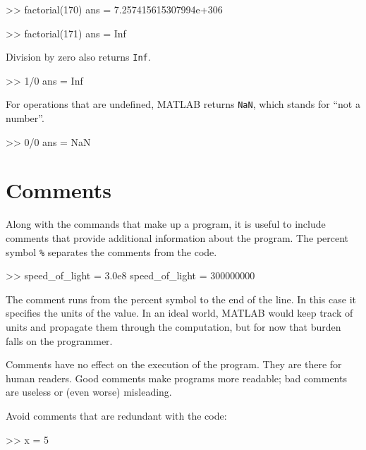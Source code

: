 \documentclass[main.tex]{subfiles}
\begin{document}

\begin{code}
>> factorial(170)
ans = 7.257415615307994e+306

>> factorial(171)
ans = Inf
\end{code}

Division by zero also returns {\tt Inf}.

\begin{code}
>> 1/0
ans = Inf
\end{code}


For operations that are undefined, MATLAB returns {\tt NaN},
which stands for ``not a number''.


\begin{code}
>> 0/0
ans = NaN
\end{code}



\section{Comments}

Along with the commands that make up a program, it is useful to include comments that provide additional information about the
program.  The percent symbol {\tt \%} separates
the comments from the code.


\begin{code}
>> speed_of_light = 3.0e8     %
speed_of_light = 300000000
\end{code}

The comment runs from the percent symbol to the end of the line.
In this case it specifies the units of the value.  In an ideal world,
MATLAB would keep track of units and propagate them through the
computation, but for now that burden falls on the programmer.


Comments have no effect on the execution of the program.  They
are there for human readers.  Good comments make programs more
readable; bad comments are useless or (even worse) misleading.

Avoid comments that are redundant with the code:

\begin{code}
>> x = 5        %
\end{code}
\end{document}
